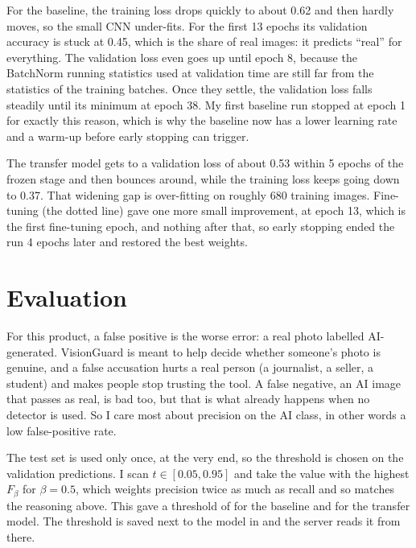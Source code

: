 
For the baseline, the training loss drops quickly to about 0.62 and then hardly moves, so the
small CNN under-fits. For the first 13 epochs its validation accuracy is stuck at 0.45, which is
the share of real images: it predicts ``real'' for everything. The validation loss even goes up
until epoch 8, because the BatchNorm running statistics used at validation time are still far from
the statistics of the training batches. Once they settle, the validation loss falls steadily until
its minimum at epoch 38. My first baseline run stopped at epoch 1 for exactly this reason, which is
why the baseline now has a lower learning rate and a warm-up before early stopping can trigger.

The transfer model gets to a validation loss of about 0.53 within 5 epochs of the frozen stage and
then bounces around, while the training loss keeps going down to 0.37. That widening gap is
over-fitting on roughly 680 training images. Fine-tuning (the dotted line) gave one more small
improvement, at epoch 13, which is the first fine-tuning epoch, and nothing after that, so early
stopping ended the run 4 epochs later and restored the best weights.

\section{Evaluation}\label{sec:2-5}
For this product, a false positive is the worse error: a real photo labelled AI-generated.
VisionGuard is meant to help decide whether someone's photo is genuine, and a false accusation hurts
a real person (a journalist, a seller, a student) and makes people stop trusting the tool. A false
negative, an AI image that passes as real, is bad too, but that is what already happens when no
detector is used. So I care most about precision on the AI class, in other words a low
false-positive rate.

The test set is used only once, at the very end, so the threshold is chosen on the validation
predictions. I scan $t\in[0.05,0.95]$ and take the value with the highest $F_{\beta}$ for
$\beta=0.5$, which weights precision twice as much as recall and so matches the reasoning above.
This gave a threshold of \vgBaselineThr{} for the baseline and \vgTransferThr{} for the transfer
model. The threshold is saved next to the model in  and the server reads it
from there.

